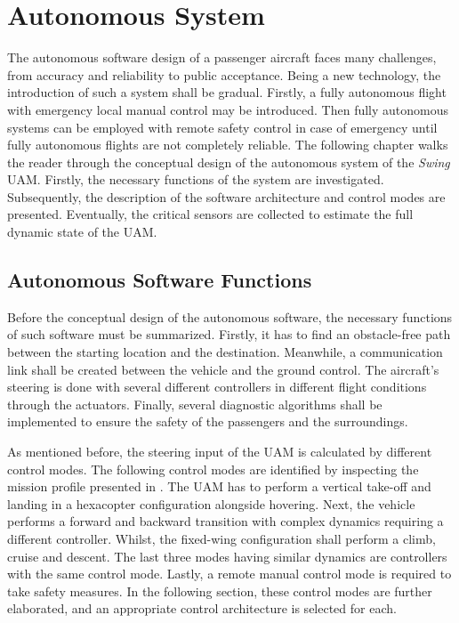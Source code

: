 \chapter{Autonomous System}
\label{ch:Autonomous_System}
The autonomous software design of a passenger aircraft faces many challenges, from accuracy and reliability to public acceptance.
Being a new technology, the introduction of such a system shall be gradual.
Firstly, a fully autonomous flight with emergency local manual control may be introduced.
Then fully autonomous systems can be employed with remote safety control in case of emergency until fully autonomous flights are not completely reliable.
The following chapter walks the reader through the conceptual design of the autonomous system of the \textit{Swing} UAM. Firstly, the necessary functions of the system are investigated.
Subsequently, the description of the software architecture and control modes are presented.
Eventually, the critical sensors are collected to estimate the full dynamic state of the UAM.

\section{Autonomous Software Functions}
Before the conceptual design of the autonomous software, the necessary functions of such software must be summarized.
Firstly, it has to find an obstacle-free path between the starting location and the destination.
Meanwhile, a communication link shall be created between the vehicle and the ground control.
The aircraft's steering is done with several different controllers in different flight conditions through the actuators.
Finally, several diagnostic algorithms shall be implemented to ensure the safety of the passengers and the surroundings.

As mentioned before, the steering input of the UAM is calculated by different control modes.
The following control modes are identified by inspecting the mission profile presented in .
The UAM has to perform a vertical take-off and landing in a hexacopter configuration alongside hovering.
Next, the vehicle performs a forward and backward transition with complex dynamics requiring a different controller.
Whilst, the fixed-wing configuration shall perform a climb, cruise and descent.
The last three modes having similar dynamics are controllers with the same control mode.
Lastly, a remote manual control mode is required to take safety measures.
In the following section, these control modes are further elaborated, and an appropriate control architecture is selected for each.

